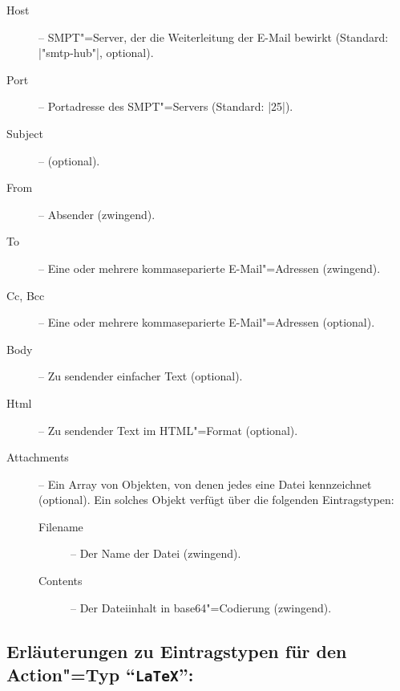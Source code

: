 \documentclass[%
fontsize=11pt
,paper=a4
,twoside
,headings=normal
,pagesize
]{scrartcl}
\begin{document}
\begin{description}

  \item[Host] -- SMPT"=Server, der die Weiterleitung der E-Mail
  bewirkt (Standard: |"smtp-hub"|, optional).

  \item[Port] -- Portadresse des SMPT"=Servers (Standard: |25|).

  \item[Subject] -- (optional).

  \item[From] -- Absender (zwingend).

  \item[To] -- Eine oder mehrere kommaseparierte E-Mail"=Adressen
  (zwingend).

  \item[Cc, Bcc] -- Eine oder mehrere kommaseparierte
  E-Mail"=Adressen (optional).

  \item[Body] -- Zu sendender einfacher Text (optional).

  \item[Html] -- Zu sendender Text im HTML"=Format (optional).

  \item[Attachments] -- Ein Array von Objekten, von denen jedes eine
  Datei kennzeichnet (optional). Ein solches Objekt verfügt über die
  folgenden Eintragstypen:

  \begin{description}

    \item[Filename] -- Der Name der Datei (zwingend). 

    \item[Contents] -- Der Dateiinhalt in base64"=Codierung (zwingend).
    
  \end{description}

\end{description}

\subsection*{Erläuterungen zu Eintragstypen für den Action"=Typ
"`\texttt{LaTeX}"':}
\end{document}
